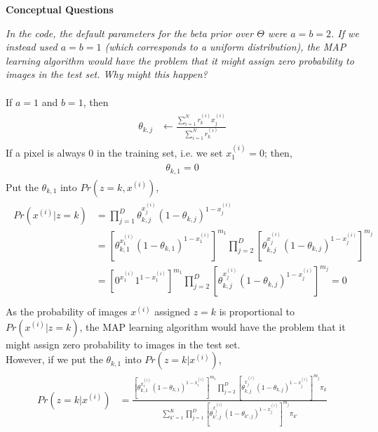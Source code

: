 \documentclass{myhw}
\begin{document}
\begin{homeworkProblem}
\textbf{Conceptual Questions}
\begin{homeworkSection}	
\emph{In the code, the default parameters for the beta prior over $\Theta$ were $a = b = 2$. If we instead used $a = b = 1$ (which corresponds to a uniform distribution), the MAP learning algorithm would have the problem that it might assign zero probability to images in the test set. Why might this happen?} \\
\\
If $a=1$ and $b=1$, then 
\begin{gather*}
\begin{aligned}
\theta_{k,j} & \leftarrow \frac{\sum_{i=1}^{N} r_k^{(i)} x_j^{(i)}}{\sum_{i=1}^{N} r_k^{(i)}}
\end{aligned}
\end{gather*}
If a pixel is always 0 in the training set, i.e. we set $x_1^{(i)}=0$; then, 
\begin{gather*}
\begin{aligned}
\theta_{k,1} = 0
\end{aligned}
\end{gather*}
Put the $\theta_{k,1}$ into $Pr(z=k, x^{(i)})$, 
\begin{gather*}
\begin{aligned}
Pr(x^{(i)}|z=k) & = \prod_{j=1}^D \theta_{k,j}^{x_j^{(i)}} (1-\theta_{k,j})^{1-x_j^{(i)}} \\
& = [ \theta_{k,1}^{x_1^{(i)}} (1-\theta_{k,1})^{1-x_1^{(i)}} ]^{m_1} \prod_{j=2}^D [ \theta_{k,j}^{x_j^{(i)}} (1-\theta_{k,j})^{1-x_j^{(i)}} ]^{m_j} \\
& = [ 0^{x_1^{(i)}} 1^{1-x_1^{(i)}} ]^{m_1} \prod_{j=2}^D [ \theta_{k,j}^{x_j^{(i)}} (1-\theta_{k,j})^{1-x_j^{(i)}} ]^{m_j} = 0 \\
\end{aligned}
\end{gather*}
As the probability of images $x^{(i)}$ assigned $z=k$ is proportional to $Pr(x^{(i)}|z=k)$, the MAP learning algorithm would have the problem that it might assign zero probability to images in the test set. \\
However, if we put the $\theta_{k,1}$ into $Pr(z=k|x^{(i)})$, 
\begin{gather*}
\begin{aligned}
Pr(z=k|x^{(i)}) & = \frac{  [ \theta_{k,1}^{x_1^{(i)}} (1-\theta_{k,1})^{1-x_1^{(i)}} ]^{m_1} \prod_{j=2}^D [ \theta_{k,j}^{x_j^{(i)}} (1-\theta_{k,j})^{1-x_j^{(i)}} ]^{m_j} \pi_k }{ \sum_{k'=1}^K \prod_{j=1}^D [ \theta_{k',j}^{x_j^{(i)}} (1-\theta_{k',j})^{1-x_j^{(i)}} ]^{m_j} \pi_{k'}} \\

\end{aligned}
\end{gather*}
\end{homeworkSection}
\end{homeworkProblem}
\end{document}
